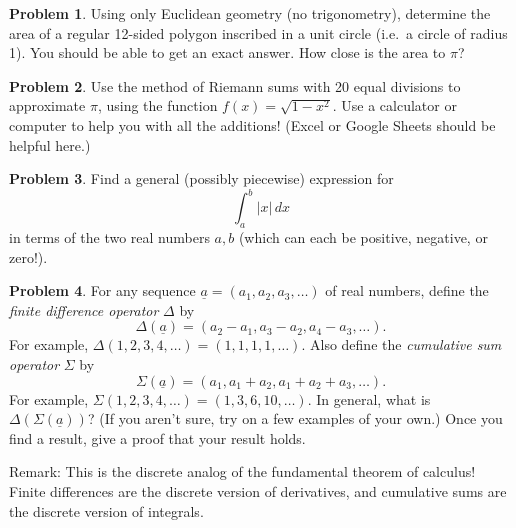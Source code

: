 \documentclass[11pt,oneside]{amsart}
\theoremstyle{definition}
\newtheorem{problem}{Problem}
\begin{document}
    \begin{problem}
        Using only Euclidean geometry (no trigonometry), determine the area of a regular 12-sided polygon inscribed in a unit circle (i.e.\ a circle of radius 1). You should be able to get an exact answer. How close is the area to $\pi$?
    \end{problem}

    \begin{problem}
        Use the method of Riemann sums with 20 equal divisions to approximate $\pi$, using the function $f(x)=\sqrt{1-x^2}$. Use a calculator or computer to help you with all the additions! (Excel or Google Sheets should be helpful here.)
    \end{problem}

    \begin{problem}
        Find a general (possibly piecewise) expression for
        \[\int_a^b |x|\,dx\]
        in terms of the two real numbers $a,b$ (which can each 
        be positive, negative, or zero!).
    \end{problem}

    \begin{problem}
        For any sequence $\underline a=(a_1,a_2,a_3,\dots)$ of real numbers, define the \emph{finite difference operator} $\Delta$ by 
        \[\Delta(\underline a)=(a_2-a_1,a_3-a_2,a_4-a_3,\dots).\]
        For example, $\Delta(1,2,3,4,\dots)=(1,1,1,1,\dots)$. Also define the \emph{cumulative sum operator} $\Sigma$ by
        \[\Sigma(\underline a)=(a_1,a_1+a_2,a_1+a_2+a_3,\dots).\]
        For example, $\Sigma(1,2,3,4,\dots)=(1,3,6,10,\dots)$. In general, what is $\Delta(\Sigma(\underline a))$? (If you aren't sure, try on a few examples of your own.) Once you find a result, give a proof that your result holds.

        Remark: This is the discrete analog of the fundamental theorem of calculus! Finite differences are the discrete version of derivatives, and cumulative sums are the discrete version of integrals.
    \end{problem}
\end{document}
